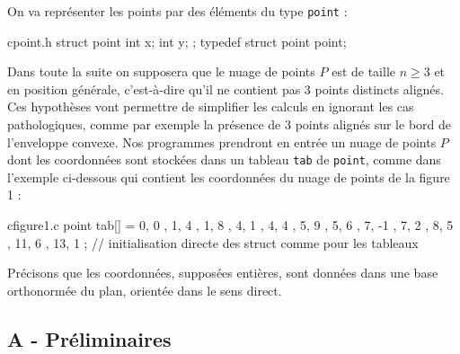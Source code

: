 \documentclass[a4paper,french,bookmarks]{article}
\begin{document}
On va représenter les points par des éléments du type \verb|point| : 

\begin{code}{c}{point.h}
struct point {
    int x;
    int y;
};
typedef struct point point;
\end{code}

Dans toute la suite on supposera que le nuage de points $P$ est de taille $n \geq 3$ et en position générale, c’est-à-dire qu’il ne contient pas 3 points distincts alignés. Ces hypothèses vont permettre de simplifier les calculs en ignorant les cas pathologiques, comme par exemple la présence de 3 points alignés sur le bord de l’enveloppe convexe. Nos programmes prendront en entrée un nuage de points $P$ dont les coordonnées sont stockées dans un tableau \verb|tab| de \verb|point|, comme dans l’exemple ci-dessous qui contient les coordonnées du nuage de points de la figure 1 :

\begin{code}{c}{figure1.c}
point tab[] = {
        { 0, 0 }, { 1, 4 }, { 1, 8 }, { 4, 1 }, { 4, 4 }, { 5, 9 },
        { 5, 6 }, { 7, -1 }, { 7, 2 }, { 8, 5 }, { 11, 6 }, { 13, 1 }
}; // initialisation directe des struct comme pour les tableaux
\end{code}

Précisons que les coordonnées, supposées entières, sont données dans une base orthonormée du plan, orientée dans le sens direct.

\subsection*{A - Préliminaires}
\end{document}
